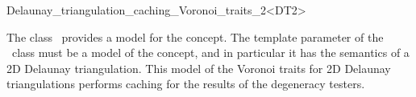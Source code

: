 

\begin{ccRefClass}{Delaunay_triangulation_caching_Voronoi_traits_2<DT2>}


\ccDefinition

The class \ccRefName\ provides a model for the 
concept. The template parameter of the \ccRefName\ class must be a
model of the  concept, and in particular it has
the semantics of a 2D Delaunay triangulation. This model of
the Voronoi traits for 2D Delaunay triangulations performs caching for the
results of the degeneracy testers.



\ccIsModel
{}

\ccTypes
{}
\ccGlue
{}

\ccSeeAlso
{}\\
\\
\\
\\
\end{ccRefClass}


